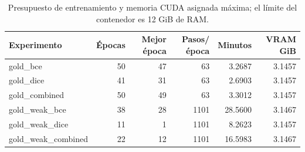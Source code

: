 \begin{table}[H]\centering\small
\caption{Presupuesto de entrenamiento y memoria CUDA asignada máxima; el límite del contenedor es 12 GiB de RAM.}
\begin{tabular}{lrrrrr}
\toprule
Experimento & Épocas & Mejor época & Pasos/época & Minutos & VRAM GiB \\
\midrule
gold\_bce & 50 & 47 & 63 & 3.2687 & 3.1457 \\
gold\_dice & 41 & 31 & 63 & 2.6903 & 3.1457 \\
gold\_combined & 50 & 49 & 63 & 3.3012 & 3.1457 \\
gold\_weak\_bce & 38 & 28 & 1101 & 28.5600 & 3.1467 \\
gold\_weak\_dice & 11 & 1 & 1101 & 8.2623 & 3.1457 \\
gold\_weak\_combined & 22 & 12 & 1101 & 16.5983 & 3.1467 \\
\bottomrule
\end{tabular}
\end{table}
